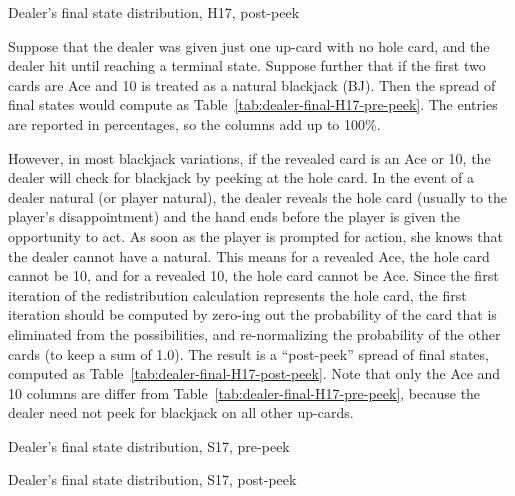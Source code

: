 \begin{table}[ht!]
\caption{Dealer's final state distribution, H17, post-peek}
\begin{center}

\end{center}
\label{tab:dealer-final-H17-post-peek}
\end{table}

Suppose that the dealer was given just one up-card with no hole card, 
and the dealer hit until reaching a terminal state.
Suppose further that if the first two cards are Ace and 10 is
treated as a natural blackjack (BJ).
Then the spread of final states would compute as 
Table~\ref{tab:dealer-final-H17-pre-peek}.
The entries are reported in percentages, so the columns add up to 100\%.

However, in most blackjack variations, if the revealed card is an Ace or 10, 
the dealer will check for blackjack by peeking at the hole card.
In the event of a dealer natural (or player natural), 
the dealer reveals the hole card (usually to the player's disappointment)
and the hand ends before the player is given the opportunity to act.
As soon as the player is prompted for action, she knows that the 
dealer cannot have a natural.
This means for a revealed Ace, the hole card cannot be 10, 
and for a revealed 10, the hole card cannot be Ace.
Since the first iteration of the redistribution 
calculation represents the hole card, the first iteration
should be computed by zero-ing out the probability of the
card that is eliminated from the possibilities, and re-normalizing
the probability of the other cards (to keep a sum of 1.0).  
The result is a ``post-peek'' spread of final states, computed as 
Table~\ref{tab:dealer-final-H17-post-peek}.
Note that only the Ace and 10 columns are differ from 
Table~\ref{tab:dealer-final-H17-pre-peek}, 
because the dealer need not peek for blackjack on all other up-cards.

\begin{table}[ht!]
\caption{Dealer's final state distribution, S17, pre-peek}
\begin{center}

\end{center}
\label{tab:dealer-final-S17-pre-peek}
\end{table}

\begin{table}[ht!]
\caption{Dealer's final state distribution, S17, post-peek}
\begin{center}

\end{center}
\label{tab:dealer-final-S17-post-peek}
\end{table}

